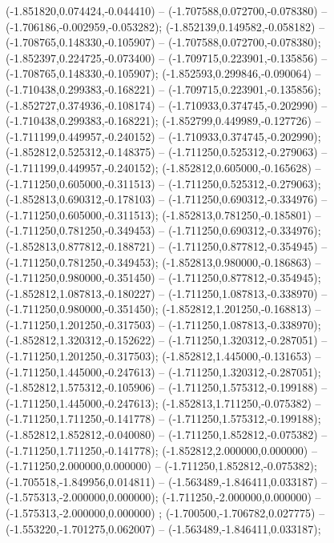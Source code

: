  (-1.851820,0.074424,-0.044410) -- (-1.707588,0.072700,-0.078380) -- (-1.706186,-0.002959,-0.053282);
 (-1.852139,0.149582,-0.058182) -- (-1.708765,0.148330,-0.105907) -- (-1.707588,0.072700,-0.078380);
 (-1.852397,0.224725,-0.073400) -- (-1.709715,0.223901,-0.135856) -- (-1.708765,0.148330,-0.105907);
 (-1.852593,0.299846,-0.090064) -- (-1.710438,0.299383,-0.168221) -- (-1.709715,0.223901,-0.135856);
 (-1.852727,0.374936,-0.108174) -- (-1.710933,0.374745,-0.202990) -- (-1.710438,0.299383,-0.168221);
 (-1.852799,0.449989,-0.127726) -- (-1.711199,0.449957,-0.240152) -- (-1.710933,0.374745,-0.202990);
 (-1.852812,0.525312,-0.148375) -- (-1.711250,0.525312,-0.279063) -- (-1.711199,0.449957,-0.240152);
 (-1.852812,0.605000,-0.165628) -- (-1.711250,0.605000,-0.311513) -- (-1.711250,0.525312,-0.279063);
 (-1.852813,0.690312,-0.178103) -- (-1.711250,0.690312,-0.334976) -- (-1.711250,0.605000,-0.311513);
 (-1.852813,0.781250,-0.185801) -- (-1.711250,0.781250,-0.349453) -- (-1.711250,0.690312,-0.334976);
 (-1.852813,0.877812,-0.188721) -- (-1.711250,0.877812,-0.354945) -- (-1.711250,0.781250,-0.349453);
 (-1.852813,0.980000,-0.186863) -- (-1.711250,0.980000,-0.351450) -- (-1.711250,0.877812,-0.354945);
 (-1.852812,1.087813,-0.180227) -- (-1.711250,1.087813,-0.338970) -- (-1.711250,0.980000,-0.351450);
 (-1.852812,1.201250,-0.168813) -- (-1.711250,1.201250,-0.317503) -- (-1.711250,1.087813,-0.338970);
 (-1.852812,1.320312,-0.152622) -- (-1.711250,1.320312,-0.287051) -- (-1.711250,1.201250,-0.317503);
 (-1.852812,1.445000,-0.131653) -- (-1.711250,1.445000,-0.247613) -- (-1.711250,1.320312,-0.287051);
 (-1.852812,1.575312,-0.105906) -- (-1.711250,1.575312,-0.199188) -- (-1.711250,1.445000,-0.247613);
 (-1.852813,1.711250,-0.075382) -- (-1.711250,1.711250,-0.141778) -- (-1.711250,1.575312,-0.199188);
 (-1.852812,1.852812,-0.040080) -- (-1.711250,1.852812,-0.075382) -- (-1.711250,1.711250,-0.141778);
 (-1.852812,2.000000,0.000000) -- (-1.711250,2.000000,0.000000) -- (-1.711250,1.852812,-0.075382);
 (-1.705518,-1.849956,0.014811) -- (-1.563489,-1.846411,0.033187) -- (-1.575313,-2.000000,0.000000);
 (-1.711250,-2.000000,0.000000) -- (-1.575313,-2.000000,0.000000) ;
 (-1.700500,-1.706782,0.027775) -- (-1.553220,-1.701275,0.062007) -- (-1.563489,-1.846411,0.033187);
